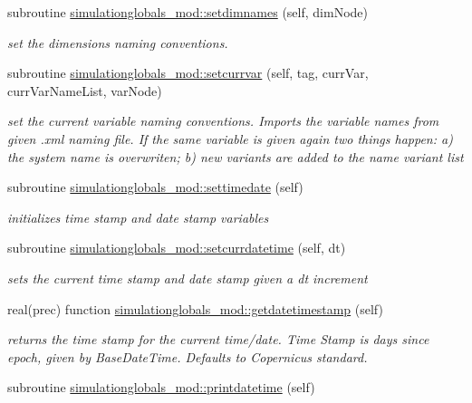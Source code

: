\begin{DoxyCompactItemize}
subroutine \mbox{\hyperlink{namespacesimulationglobals__mod_a878fdcfa67037a1bc8411995394c2bef}{simulationglobals\+\_\+mod\+::setdimnames}} (self, dim\+Node)
\begin{DoxyCompactList}\small\item\em set the dimensions naming conventions. \end{DoxyCompactList}\item 
subroutine \mbox{\hyperlink{namespacesimulationglobals__mod_a4dd64cb7a896b62d90e20a7eab65a6bf}{simulationglobals\+\_\+mod\+::setcurrvar}} (self, tag, curr\+Var, curr\+Var\+Name\+List, var\+Node)
\begin{DoxyCompactList}\small\item\em set the current variable naming conventions. Imports the variable names from given .xml naming file. If the same variable is given again two things happen\+: a) the system name is overwriten; b) new variants are added to the name variant list \end{DoxyCompactList}\item 
subroutine \mbox{\hyperlink{namespacesimulationglobals__mod_aefda4344f03a705055ad6cb97cb90c65}{simulationglobals\+\_\+mod\+::settimedate}} (self)
\begin{DoxyCompactList}\small\item\em initializes time stamp and date stamp variables \end{DoxyCompactList}\item 
subroutine \mbox{\hyperlink{namespacesimulationglobals__mod_acbb28eee5547a03dc28c924d8e23ad9a}{simulationglobals\+\_\+mod\+::setcurrdatetime}} (self, dt)
\begin{DoxyCompactList}\small\item\em sets the current time stamp and date stamp given a dt increment \end{DoxyCompactList}\item 
real(prec) function \mbox{\hyperlink{namespacesimulationglobals__mod_a1fd33b50ae2216b3b7db074da1672398}{simulationglobals\+\_\+mod\+::getdatetimestamp}} (self)
\begin{DoxyCompactList}\small\item\em returns the time stamp for the current time/date. Time Stamp is days since epoch, given by Base\+Date\+Time. Defaults to Copernicus standard. \end{DoxyCompactList}\item 
subroutine \mbox{\hyperlink{namespacesimulationglobals__mod_abd0e28a5ec7733d0292dd8e631e96577}{simulationglobals\+\_\+mod\+::printdatetime}} (self)

\end{DoxyCompactItemize}
